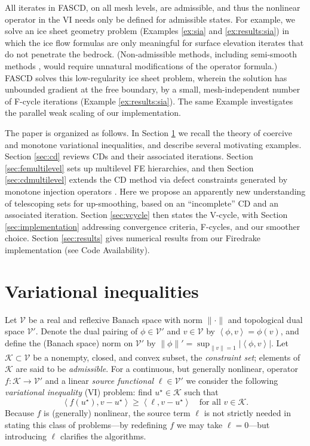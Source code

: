 \documentclass[review,hidelinks,onefignum,onetabnum]{siamart220329}
\newcommand{\cK}{\mathcal{K}}
\newcommand{\cV}{\mathcal{V}}
\newcommand{\ip}[2]{\left<#1,#2\right>}
\begin{document}
All iterates in FASCD, on all mesh levels, are admissible, and thus the nonlinear operator in the VI needs only be defined for admissible states.  For example, we solve an ice sheet geometry problem (Examples \ref{ex:sia} and \ref{ex:results:sia}) in which the ice flow formulas are only meaningful for surface elevation iterates that do not penetrate the bedrock.  (Non-admissible methods, including semi-smooth methods \cite{BensonMunson2006}, would require unnatural modifications of the operator formula.)  FASCD solves this low-regularity ice sheet problem, wherein the solution has unbounded gradient at the free boundary, by a small, mesh-independent number of F-cycle iterations (Example \ref{ex:results:sia}). The same Example investigates the parallel weak scaling \cite{Bueler2021} of our implementation.

The paper is organized as follows.  In Section \ref{sec:vi} we recall the theory of coercive and monotone variational inequalities, and describe several motivating examples.  Section \ref{sec:cd} reviews CDs and their associated iterations.  Section \ref{sec:femultilevel} sets up multilevel FE hierarchies, and then Section \ref{sec:cdmultilevel} extends the CD method via defect constraints generated by monotone injection operators \cite{GraeserKornhuber2009}.  Here we propose an apparently new understanding of telescoping sets for up-smoothing, based on an ``incomplete'' CD and an associated iteration.  Section \ref{sec:vcycle} then states the V-cycle, with Section \ref{sec:implementation} addressing convergence criteria, F-cycles, and our smoother choice.  Section \ref{sec:results} gives numerical results from our Firedrake \cite{Rathgeberetal2016} implementation (see Code Availability).


\section{Variational inequalities} \label{sec:vi}

Let $\cV$ be a real and reflexive Banach space with norm $\|\cdot\|$ and topological dual space $\cV'$.  Denote the dual pairing of $\phi \in \cV'$ and $v\in\cV$ by $\ip{\phi}{v} = \phi(v)$, and define the (Banach space) norm on $\cV'$ by $\|\phi\|' = \sup_{\|v\|=1} |\ip{\phi}{v}|$.  Let $\cK \subset \cV$ be a nonempty, closed, and convex subset, the \emph{constraint set}; elements of $\cK$ are said to be \emph{admissible}.  For a continuous, but generally nonlinear, operator $f:\cK \to \cV'$ and a linear \emph{source functional} $\ell\in \cV'$ we consider the following \emph{variational inequality} (VI) problem: find $u^\star\in \cK$ such that
\begin{equation}
\ip{f(u^\star)}{v-u^\star} \ge \ip{\ell}{v-u^\star} \quad \text{for all } v\in \cK. \label{eq:vi}
\end{equation}
Because $f$ is (generally) nonlinear, the source term $\ell$ is not strictly needed in stating this class of problems---by redefining $f$ we may take $\ell=0$---but introducing $\ell$ clarifies the algorithms.
\end{document}
